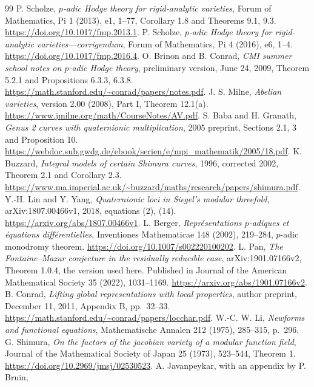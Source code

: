 \documentclass[11pt]{article}
\theoremstyle{definition}
\theoremstyle{remark}
\begin{document}
\begin{thebibliography}{99}
 P. Scholze,
\emph{$p$-adic Hodge theory for rigid-analytic varieties},
Forum of Mathematics, Pi 1 (2013), e1, 1--77,
Corollary 1.8 and Theorems 9.1, 9.3.
\url{https://doi.org/10.1017/fmp.2013.1}.
 P. Scholze,
\emph{$p$-adic Hodge theory for rigid-analytic varieties---corrigendum},
Forum of Mathematics, Pi 4 (2016), e6, 1--4.
\url{https://doi.org/10.1017/fmp.2016.4}.
 O. Brinon and B. Conrad,
\emph{CMI summer school notes on $p$-adic Hodge theory},
preliminary version, June 24, 2009,
Theorem 5.2.1 and Propositions 6.3.3, 6.3.8.
\url{https://math.stanford.edu/~conrad/papers/notes.pdf}.
 J. S. Milne, \emph{Abelian varieties},
version 2.00 (2008), Part I, Theorem 12.1(a).
\url{https://www.jmilne.org/math/CourseNotes/AV.pdf}.
 S. Baba and H. Granath,
\emph{Genus 2 curves with quaternionic multiplication}, 2005 preprint,
Sections 2.1, 3 and Proposition 10.
\url{https://webdoc.sub.gwdg.de/ebook/serien/e/mpi_mathematik/2005/18.pdf}.
 K. Buzzard, \emph{Integral models of certain Shimura
curves}, 1996, corrected 2002, Theorem 2.1 and Corollary 2.3.
\url{https://www.ma.imperial.ac.uk/~buzzard/maths/research/papers/shimura.pdf}.
 Y.-H. Lin and Y. Yang, \emph{Quaternionic loci in
Siegel's modular threefold}, arXiv:1807.00466v1, 2018, equations (2), (14).
\url{https://arxiv.org/abs/1807.00466v1}.
 L. Berger, \emph{Repr\'esentations $p$-adiques et
\'equations diff\'erentielles}, Inventiones Mathematicae 148 (2002),
219--284, $p$-adic monodromy theorem.
\url{https://doi.org/10.1007/s002220100202}.
 L. Pan, \emph{The Fontaine--Mazur conjecture in the
residually reducible case}, arXiv:1901.07166v2,
Theorem 1.0.4, the version used here. Published in Journal of the
American Mathematical Society 35 (2022), 1031--1169.
\url{https://arxiv.org/abs/1901.07166v2}.
 B. Conrad,
\emph{Lifting global representations with local properties},
author preprint, December 11, 2011, Appendix B, pp.~32--33.
\url{https://math.stanford.edu/~conrad/papers/locchar.pdf}.
 W.-C. W. Li,
\emph{Newforms and functional equations}, Mathematische Annalen
212 (1975), 285--315, p.~296.
 G. Shimura,
\emph{On the factors of the jacobian variety of a modular function field},
Journal of the Mathematical Society of Japan 25 (1973), 523--544,
Theorem 1.
\url{https://doi.org/10.2969/jmsj/02530523}.
 A. Javanpeykar, with an appendix by P. Bruin,

\end{thebibliography}
\end{document}
